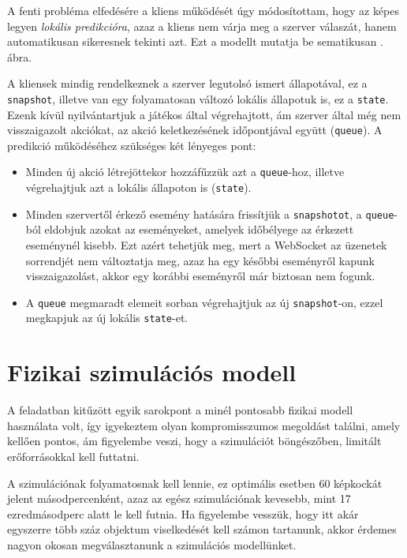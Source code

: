 A fenti probléma elfedésére a kliens működését úgy módosítottam, hogy az képes
legyen \emph{lokális predikcióra}, azaz a kliens nem várja meg a szerver
válaszát, hanem automatikusan sikeresnek tekinti azt. Ezt a modellt mutatja be
sematikusan . ábra.


A kliensek mindig rendelkeznek a szerver legutolsó ismert állapotával, ez a
\texttt{snapshot}, illetve van egy folyamatosan változó lokális állapotuk is, ez
a \texttt{state}. Ezenk kívül nyilvántartjuk a játékos által végrehajtott, ám
szerver által még nem visszaigazolt akciókat, az akció keletkezésének
időpontjával együtt (\texttt{queue}). A predikció működéséhez szükséges két
lényeges pont:

\begin{itemize}
  \item Minden új akció létrejöttekor hozzáfűzzük azt a \texttt{queue}-hoz,
    illetve végrehajtjuk azt a lokális állapoton is (\texttt{state}).
  \item Minden szervertől érkező esemény hatására frissítjük a
    \texttt{snapshotot}, a \texttt{queue}-ból eldobjuk azokat az eseményeket,
    amelyek időbélyege az érkezett eseménynél kisebb. Ezt azért tehetjük meg,
    mert a WebSocket az üzenetek sorrendjét nem változtatja meg, azaz ha egy
    későbbi eseményről kapunk visszaigazolást, akkor egy korábbi eseményről már
    biztosan nem fogunk.
  \item A \texttt{queue} megmaradt elemeit sorban végrehajtjuk az új
    \texttt{snapshot}-on, ezzel megkapjuk az új lokális \texttt{state}-et.
\end{itemize}

\section{Fizikai szimulációs modell}

A feladatban kitűzött egyik sarokpont a minél pontosabb fizikai modell
használata volt, így igyekeztem olyan kompromisszumos megoldást találni, amely
kellően pontos, ám figyelembe veszi, hogy a szimulációt böngészőben, limitált
erőforrásokkal kell futtatni.

A szimulációnak folyamatosnak kell lennie, ez optimális esetben 60 képkockát
jelent másodpercenként, azaz az egész szimulációnak kevesebb, mint 17
ezredmásodperc alatt le kell futnia.  Ha figyelembe vesszük, hogy itt akár
egyszerre több száz objektum viselkedését kell számon tartanunk, akkor érdemes
nagyon okosan megválasztanunk a szimulációs modellünket.

